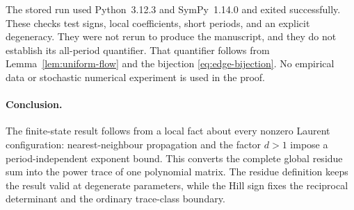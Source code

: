 The stored run used Python~3.12.3 and SymPy~1.14.0 and exited
successfully. These checks test signs, local coefficients, short
periods, and an explicit degeneracy. They were not rerun to produce
the manuscript, and they do not establish its all-period
quantifier. That quantifier follows from
Lemma~\ref{lem:uniform-flow} and the bijection
\eqref{eq:edge-bijection}. No empirical data or stochastic numerical
experiment is used in the proof.

\paragraph{Conclusion.}
The finite-state result follows from a local fact about every
nonzero Laurent configuration: nearest-neighbour propagation and
the factor $d>1$ impose a period-independent exponent bound.
This converts the complete global residue sum into the power trace
of one polynomial matrix. The residue definition keeps the result
valid at degenerate parameters, while the Hill sign fixes the
reciprocal determinant and the ordinary trace-class boundary.
